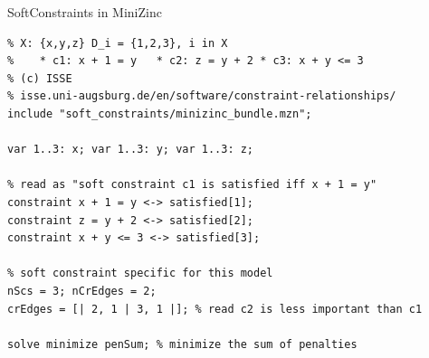 \begin{frame}[fragile]{SoftConstraints in MiniZinc}
\begin{lstlisting}
% X: {x,y,z} D_i = {1,2,3}, i in X
%    * c1: x + 1 = y   * c2: z = y + 2 * c3: x + y <= 3
% (c) ISSE
% isse.uni-augsburg.de/en/software/constraint-relationships/
include "soft_constraints/minizinc_bundle.mzn";

var 1..3: x; var 1..3: y; var 1..3: z;

% read as "soft constraint c1 is satisfied iff x + 1 = y"
constraint x + 1 = y <-> satisfied[1];
constraint z = y + 2 <-> satisfied[2];
constraint x + y <= 3 <-> satisfied[3];

% soft constraint specific for this model
nScs = 3; nCrEdges = 2;
crEdges = [| 2, 1 | 3, 1 |]; % read c2 is less important than c1

solve minimize penSum; % minimize the sum of penalties
\end{lstlisting}

\end{frame}